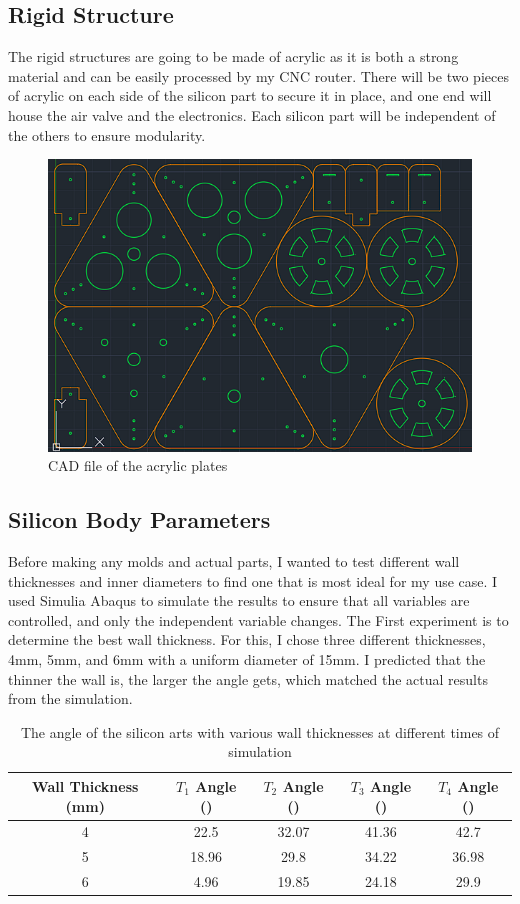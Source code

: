 \documentclass[twoside]{article}
\begin{document}
\subsection{Rigid Structure}
The rigid structures are going to be made of acrylic as it is both a strong material and can be easily processed by my CNC router. There will be two pieces of acrylic on each side of the silicon part to secure it in place, and one end will house the air valve and the electronics. Each silicon part will be independent of the others to ensure modularity.

\begin{figure} [H]
	\centering
	\includegraphics[scale=0.5]{acrylic_plate_cad}
	\caption{CAD file of the acrylic plates}
\end{figure}

\subsection{Silicon Body Parameters}
Before making any molds and actual parts, I wanted to test different wall thicknesses and inner diameters to find one that is most ideal for my use case. I used Simulia Abaqus to simulate the results to ensure that all variables are controlled, and only the independent variable changes. The First experiment is to determine the best wall thickness. For this, I chose three different thicknesses, 4mm, 5mm, and 6mm with a uniform diameter of 15mm. I predicted that the thinner the wall is, the larger the angle gets, which matched the actual results from the simulation.

\begin{table} [H]
	\centering
	\begin{tabular}{|c|c|c|c|c|}
	\hline
	Wall Thickness (mm) & $T_{1}$ Angle (\degree) & $T_{2}$ Angle (\degree) & $T_{3}$ Angle (\degree) & $T_{4}$ Angle (\degree)\\
	\hline
	4 & 22.5 & 32.07 & 41.36 & 42.7\\
	\hline
	5 & 18.96 & 29.8 & 34.22 & 36.98\\
	\hline
	6 & 4.96& 19.85 & 24.18 & 29.9\\
	\hline
	\end{tabular}
	\caption{The angle of the silicon arts with various wall thicknesses at different times of simulation}
\end{table}
\end{document}
